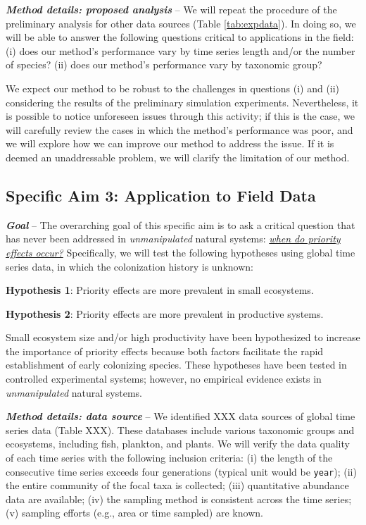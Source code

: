 \documentclass[12pt, class=article, crop=false]{standalone}
\begin{document}
\textit{\textbf{Method details: proposed analysis}} --
We will repeat the procedure of the preliminary analysis for other data sources (Table \ref{tab:expdata}). 
In doing so, we will be able to answer the following questions critical to applications in the field: (i) does our method's performance vary by time series length and/or the number of species? (ii) does our method's performance vary by taxonomic group?

We expect our method to be robust to the challenges in questions (i) and (ii) considering the results of the preliminary simulation experiments.
Nevertheless, it is possible to notice unforeseen issues through this activity; if this is the case, we will carefully review the cases in which the method's performance was poor, and we will explore how we can improve our method to address the issue.
If it is deemed an unaddressable problem, we will clarify the limitation of our method.

\subsection*{Specific Aim 3: Application to Field Data}

\textbf{\textit{Goal}} -- 
The overarching goal of this specific aim is to ask a critical question that has never been addressed in \textit{unmanipulated} natural systems: \ul{\textit{when do priority effects occur?}} Specifically, we will test the following hypotheses using global time series data, in which the colonization history is unknown:

\textbf{Hypothesis 1}: Priority effects are more prevalent in small ecosystems.

\textbf{Hypothesis 2}: Priority effects are more prevalent in productive systems.

Small ecosystem size and/or high productivity have been hypothesized to increase the importance of priority effects because both factors facilitate the rapid establishment of early colonizing species.
These hypotheses have been tested in controlled experimental systems; however, no empirical evidence exists in \textit{unmanipulated} natural systems.

\textit{\textbf{Method details: data source}} --
We identified XXX data sources of global time series data (Table XXX).
These databases include various taxonomic groups and ecosystems, including fish, plankton, and plants.
We will verify the data quality of each time series with the following inclusion criteria: (i) the length of the consecutive time series exceeds four generations (typical unit would be \texttt{year}); (ii) the entire community of the focal taxa is collected; (iii) quantitative abundance data are available; (iv) the sampling method is consistent across the time series; (v) sampling efforts (e.g., area or time sampled) are known.
\end{document}
